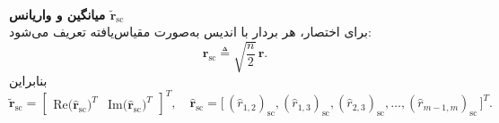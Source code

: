 \begin{اثبات}
	\qquad \\
	\textbf{میانگین و واریانس $\tilde{\mathbf{r}}_{\mathrm{sc}}$} \\
	برای اختصار، هر بردار با اندیس  به‌صورت مقیاس‌یافته تعریف می‌شود:
	\begin{equation}
		\mathbf{r}_{\mathrm{sc}} \triangleq \sqrt{\frac{n}{2}}\,\mathbf{r}.
	\end{equation}
	بنابراین
	\[
	\tilde{\mathbf{r}}_{\mathrm{sc}}
	=
	\begin{bmatrix}
		\mathrm{Re}\!\big(\hat{\mathbf{r}}_{\mathrm{sc}}\big)^{\!T} &
		\mathrm{Im}\!\big(\hat{\mathbf{r}}_{\mathrm{sc}}\big)^{\!T}
	\end{bmatrix}^{\!T},
	\quad
	\hat{\mathbf{r}}_{\mathrm{sc}}
	=
	\big[\,(\hat r_{1,2})_{\mathrm{sc}}, (\hat r_{1,3})_{\mathrm{sc}}, (\hat r_{2,3})_{\mathrm{sc}}, \ldots, (\hat r_{m-1,m})_{\mathrm{sc}} \,\big]^{T}.
	\]
	

\end{اثبات}
